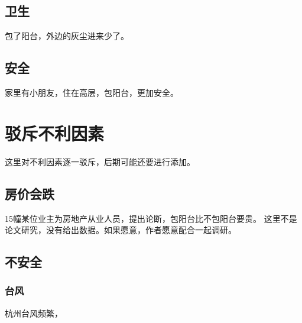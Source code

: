 \documentclass[a4paper,12pt]{article}
\begin{document}
\subsection{卫生}
包了阳台，外边的灰尘进来少了。

\subsection{安全}
家里有小朋友，住在高层，包阳台，更加安全。
\section{驳斥不利因素}
这里对不利因素逐一驳斥，后期可能还要进行添加。

\subsection{房价会跌}
15幢某位业主为房地产从业人员，提出论断，包阳台比不包阳台要贵。\newline
这里不是论文研究，没有给出数据。如果愿意，作者愿意配合一起调研。

\subsection{不安全}
\subsubsection{台风}
杭州台风频繁，
\end{document}
